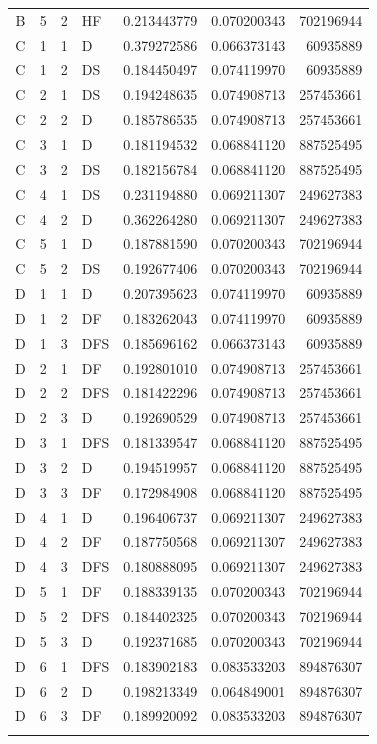 \documentclass[11pt,a4paper]{article}
\theoremstyle{definition}
\begin{document}
\begin{longtable}{@{}c r c l r r r@{}}
B & 5 & 2 & HF & 0.213443779 & 0.070200343 & 702196944 \\
\addlinespace
C & 1 & 1 & D & 0.379272586 & 0.066373143 & 60935889 \\
C & 1 & 2 & DS & 0.184450497 & 0.074119970 & 60935889 \\
C & 2 & 1 & DS & 0.194248635 & 0.074908713 & 257453661 \\
C & 2 & 2 & D & 0.185786535 & 0.074908713 & 257453661 \\
C & 3 & 1 & D & 0.181194532 & 0.068841120 & 887525495 \\
C & 3 & 2 & DS & 0.182156784 & 0.068841120 & 887525495 \\
C & 4 & 1 & DS & 0.231194880 & 0.069211307 & 249627383 \\
C & 4 & 2 & D & 0.362264280 & 0.069211307 & 249627383 \\
C & 5 & 1 & D & 0.187881590 & 0.070200343 & 702196944 \\
C & 5 & 2 & DS & 0.192677406 & 0.070200343 & 702196944 \\
\addlinespace
D & 1 & 1 & D & 0.207395623 & 0.074119970 & 60935889 \\
D & 1 & 2 & DF & 0.183262043 & 0.074119970 & 60935889 \\
D & 1 & 3 & DFS & 0.185696162 & 0.066373143 & 60935889 \\
D & 2 & 1 & DF & 0.192801010 & 0.074908713 & 257453661 \\
D & 2 & 2 & DFS & 0.181422296 & 0.074908713 & 257453661 \\
D & 2 & 3 & D & 0.192690529 & 0.074908713 & 257453661 \\
D & 3 & 1 & DFS & 0.181339547 & 0.068841120 & 887525495 \\
D & 3 & 2 & D & 0.194519957 & 0.068841120 & 887525495 \\
D & 3 & 3 & DF & 0.172984908 & 0.068841120 & 887525495 \\
D & 4 & 1 & D & 0.196406737 & 0.069211307 & 249627383 \\
D & 4 & 2 & DF & 0.187750568 & 0.069211307 & 249627383 \\
D & 4 & 3 & DFS & 0.180888095 & 0.069211307 & 249627383 \\
D & 5 & 1 & DF & 0.188339135 & 0.070200343 & 702196944 \\
D & 5 & 2 & DFS & 0.184402325 & 0.070200343 & 702196944 \\
D & 5 & 3 & D & 0.192371685 & 0.070200343 & 702196944 \\
D & 6 & 1 & DFS & 0.183902183 & 0.083533203 & 894876307 \\
D & 6 & 2 & D & 0.198213349 & 0.064849001 & 894876307 \\
D & 6 & 3 & DF & 0.189920092 & 0.083533203 & 894876307 \\
\addlinespace
\end{longtable}
\endgroup
\end{document}
